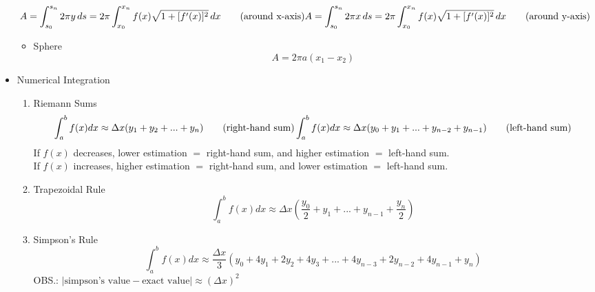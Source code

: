 \begin{itemize}
			\begin{equation}
				A=\int_{s_0}^{s_n} 2 \pi y \, ds = 2 \pi \int_{x_0}^{x_n} f(x) \sqrt{1 + [f'(x)]^2} \, dx \qquad \textrm{(around x-axis)} \\
				A=\int_{s_0}^{s_n} 2 \pi x \, ds = 2 \pi \int_{x_0}^{x_n} f(x) \sqrt{1 + [f'(x)]^2} \, dx \qquad \textrm{(around y-axis)}
			\end{equation}
			\begin{itemize}
				\item Sphere
					\begin{equation}
						A = 2 \pi a (x_1-x_2)
					\end{equation}
			\end{itemize}
		\item Numerical Integration
			\begin{enumerate}
				\item Riemann Sums
					\begin{equation}
						\int_a^b f(x) dx \approx \Delta x (y_1+y_2+...+y_n) \qquad \textrm{(right-hand sum)} \\
						\int_a^b f(x) dx \approx \Delta x (y_0+y_1+...+y_{n-2}+y_{n-1}) \qquad \textrm{(left-hand sum)}
					\end{equation}
					If $f(x)$ decreases, lower estimation $=$ right-hand sum, and higher estimation $=$ left-hand sum. \\
					If $f(x)$ increases, higher estimation $=$ right-hand sum, and lower estimation $=$ left-hand sum.
				\item Trapezoidal Rule
					\begin{equation}
						\int_a^b f(x) dx \approx \Delta x \left( \frac{y_0}{2} + y_1 + ... + y_{n-1} + \frac{y_n}{2} \right)
					\end{equation}
				\item Simpson's Rule
					\begin{equation}
						\int_a^b f(x) dx \approx \frac{\Delta x}{3} (y_0+4 y_1 +2 y_2+ 4 y_3+...+4 y_{n-3}+2 y_{n-2} + 4 y_{n-1} + y_n)
					\end{equation}
					OBS.: $|\textrm{simpson's value} - \textrm{exact value}| \approx ( \Delta x )^2$
			\end{enumerate}
	\end{itemize}
